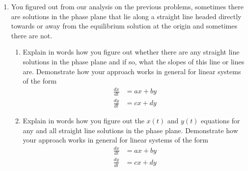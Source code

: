 \begin{enumerate}
\begin{itemize}
\end{itemize}


\clearpage

\item You figured out from our analysis on the previous problems, sometimes there are solutions in the phase plane that lie along a straight line headed directly towards or away from the equilibrium solution at the origin and sometimes there are not. \label{10HWproblem3}

\begin{enumerate}
\item	Explain in words how you figure out whether there are any straight line solutions in the phase plane and if so, what the slopes of this line or lines are. Demonstrate how your approach works in general for linear systems of the form \label{10HWproblem3parta}
\begin{align*}
\frac{dx}{dt}&=ax+by\\
\frac{dy}{dt}&=cx+dy
\end{align*}

\item	Explain in words how you figure out the $x(t)$ and $y(t)$ equations for any and all straight line solutions in the phase plane. Demonstrate how your approach works in general for linear systems of the form \label{10HWproblem3partb} 
\begin{align*}
\frac{dx}{dt}&=ax+by\\
\frac{dy}{dt}&=cx+dy
\end{align*}


\end{enumerate}
\end{enumerate}
